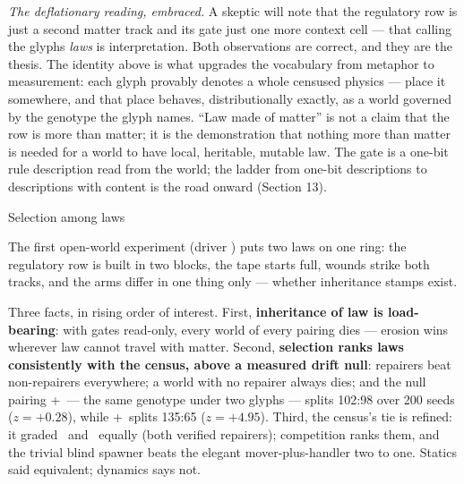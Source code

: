 {\it The deflationary reading, embraced.} A skeptic will note
that the regulatory row is just a second matter track and its
gate just one more context cell --- that calling the glyphs {\it
laws} is interpretation. Both observations are correct, and they
are the thesis. The identity above is what upgrades the vocabulary
from metaphor to measurement: each glyph provably denotes a whole
censused physics --- place it somewhere, and that place behaves,
distributionally exactly, as a world governed by the genotype the
glyph names. “Law made of matter” is not a claim that the row is
more than matter; it is the demonstration that nothing more than
matter is needed for a world to have local, heritable, mutable
law. The gate is a one-bit rule description read from the world;
the ladder from one-bit descriptions to descriptions with content
is the road onward (Section 13).

\sec Selection among laws

The first open-world experiment (driver ) puts two
laws on one ring: the regulatory row is built in two blocks, the
tape starts full, wounds strike both tracks, and the arms differ
in one thing only --- whether inheritance stamps exist.

\medskip
\noindent{}
\smallskip
{}
\medskip

\noindent Three facts, in rising order of interest. First, {\bf
inheritance of law is load-bearing}: with gates read-only, every
world of every pairing dies --- erosion wins wherever law cannot
travel with matter. Second, {\bf selection ranks laws consistently
with the census, above a measured drift null}: repairers beat
non-repairers everywhere; a world with no repairer always dies;
and the null pairing \lb+\lnull\ --- the same genotype under two
glyphs --- splits 102:98 over 200 seeds ($z=+0.28$), while
\la+\lb\ splits 135:65 ($z=+4.95$). Third, the census's tie is
refined: it graded \la\ and \lb\ equally (both verified
repairers); competition ranks them, and the trivial blind spawner
beats the elegant mover-plus-handler two to one. Statics said
equivalent; dynamics says not.

